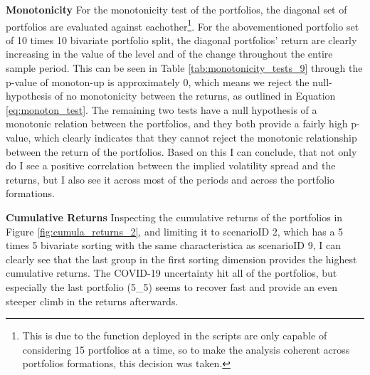 \textbf{Monotonicity} For the monotonicity test of the portfolios, the diagonal set of portfolios are evaluated against eachother\footnote{This is due to the function deployed in the scripts are only capable of considering 15 portfolios at a time, so to make the analysis coherent across portfolios formations, this decision was taken.}. For the abovementioned portfolio set of 10 times 10 bivariate portfolio split, the diagonal portfolios' return are clearly increasing in the value of the level and of the change throughout the entire sample period. This can be seen in Table \ref{tab:monotonicity_tests_9} through the p-value of monoton-up is approximately 0, which means we reject the null-hypothesis of no monotonicity between the returns, as outlined in Equation \ref{eq:monoton_test}. The remaining two tests have a null hypothesis of a monotonic relation between the portfolios, and they both provide a fairly high p-value, which clearly indicates that they cannot reject the monotonic relationship between the return of the portfolios. Based on this I can conclude, that not only do I see a positive correlation between the implied volatility spread and the returns, but I also see it across most of the periods and across the portfolio formations. 

\textbf{Cumulative Returns} Inspecting the cumulative returns of the portfolios in Figure \ref{fig:cumula_returns_2}, and limiting it to scenarioID 2, which has a 5 times 5 bivariate sorting with the same characteristica as scenarioID 9, I can clearly see that the last group in the first sorting dimension provides the highest cumulative returns. The COVID-19 uncertainty hit all of the portfolios, but especially the last portfolio (5\_5) seems to recover fast and provide an even steeper climb in the returns afterwards.

